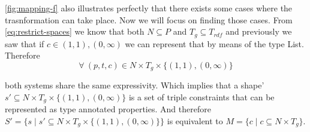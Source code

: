 \cref{fig:mapping-f} also illustrates perfectly that there exists some cases where the trasnformation can take
place. Now we will focus on finding those cases. From \cref{eq:restrict-spaces} we know that both $N \subseteq P$
and $T_g \subseteq T_{rdf}$ and previously we saw that if $c \in {(1,1), (0,\infty)}$ we can represent that by means
of the type List. Therefore
\begin{equation}\label{eq:restriction}
    \forall\ (p,t,c) \in N \times T_g \times \{(1,1),(0,\infty)\}   
\end{equation}

both systems share the same expressivity. Which implies that a shape' $s' \subseteq N \times T_g \times \{(1,1),(0,\infty)\}$
is a set of triple constraints that can be represented as type annotated properties. And therefore
$S'=\{s \mid s' \subseteq N \times T_g \times \{(1,1),(0,\infty)\} \}$ is equivalent to $M = \{ c \mid c \subseteq N \times T_{g} \}$.